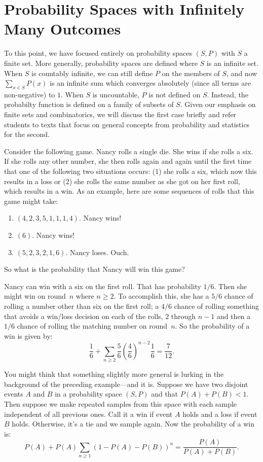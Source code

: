 \section{Probability Spaces with Infinitely Many Outcomes}

To this point, we have focused entirely on probability spaces
$(S,P)$ with $S$ a finite set.  More generally, probability
spaces are defined where $S$ is an infinite set.  When $S$ is
countably infinite, we can still define $P$ on the members
of $S$, and now $\sum_{x\in S} P(x)$ is an infinite sum
which converges absolutely (since all terms are non-negative)
to $1$.  When $S$ is uncountable, $P$ is not defined on $S$.
Instead, the probabilty function is defined on a family of
subsets of $S$.  Given our emphasis on finite sets and combinatorics,
we will discuss the first case briefly and refer students to
texts that focus on general concepts from probability and statistics
for the second.

\begin{example}
  Consider the following game.  Nancy rolls a single die.  She wins
  if she rolls a six.  If she rolls any other number, she then rolls
  again and again until the first time that one of the following two
  situations occurs: (1) she rolls a six, which now this results in a
  loss or (2) she rolls the same number as she got on her first roll,
  which results in a win. As an example, here are some sequences of
  rolls that this game might take:
\begin{enumerate}
\item $(4,2,3,5,1,1,1,4)$.  Nancy wins!
\item $(6)$.  Nancy wins!
\item $(5,2, 3,2,1,6)$. Nancy loses. Ouch.
\end{enumerate}
So what is the probability that Nancy will win this game?

Nancy can win with a six on the first roll.  That has probability $1/6$.
Then she might win on round~$n$ where $n\ge2$.  To accomplish this, she
has a $5/6$ chance of rolling a number other than six on the first roll;
a $4/6$ chance of rolling something that avoids a win/loss decision on
each of the rolls, $2$ through $n-1$ and then a $1/6$ chance of rolling
the matching number on round~$n$.
So the probability of a win is given by:
\[
 \frac{1}{6}+\sum_{n\ge 2}\frac{5}{6}\left(\frac{4}{6}\right)^{n-2}\frac{1}{6} = \frac{7}{12}.
\]

\end{example}
\begin{example}
You might think that something slightly more general is lurking
in the background of the preceding example---and it is.  Suppose we
have two disjoint events $A$ and $B$ in a probability space $(S,P)$ and
that $P(A)+P(B)<1$.  Then suppose
we make repeated samples from this space with each sample independent
of all previous ones.  Call it a win if event $A$ holds and a loss if
event $B$ holds.  Otherwise, it's a tie and we sample again.  Now the
probability of a win is:
\[
P(A)+P(A)\sum_{n\ge 1}(1-P(A)-P(B))^n=\frac{P(A)}{P(A)+P(B)}.
\]
\end{example}

